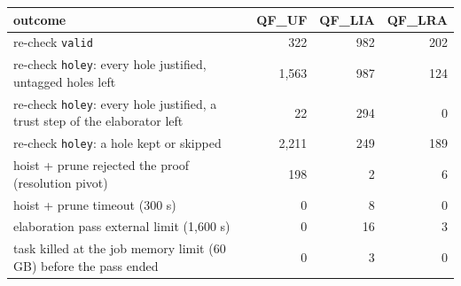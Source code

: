 \begin{tabular}{p{8.6cm}rrr}
\toprule
outcome & QF\_UF & QF\_LIA & QF\_LRA \\
\midrule
re-check \texttt{valid} & 322 & 982 & 202 \\
re-check \texttt{holey}: every hole justified, untagged holes left & 1,563 & 987 & 124 \\
re-check \texttt{holey}: every hole justified, a trust step of the elaborator left & 22 & 294 & 0 \\
re-check \texttt{holey}: a hole kept or skipped & 2,211 & 249 & 189 \\
hoist + prune rejected the proof (resolution pivot) & 198 & 2 & 6 \\
hoist + prune timeout (300 s) & 0 & 8 & 0 \\
elaboration pass external limit (1,600 s) & 0 & 16 & 3 \\
task killed at the job memory limit (60 GB) before the pass ended & 0 & 3 & 0 \\
\bottomrule
\end{tabular}
